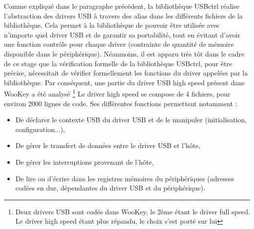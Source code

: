 \noindent Comme expliqué dans le paragraphe précédent, la bibliothèque USBctrl réalise l'abstraction des drivers USB à travers des alias dans les différents fichiers de la bibliothèque. Cela permet à la bibliothèque de pouvoir être utilisée avec n'importe quel driver USB et de garantir sa portabilité, tout en évitant d'avoir une fonction contrôle pour chaque driver (contrainte de quantité de mémoire disponible dans le périphérique). Néanmoins, il est apparu très tôt dans le cadre de ce stage que la vérification formelle de la bibliothèque USBctrl, pour être précise, nécessitait de vérifier formellement les fonctions du driver appelées par la bibliothèque. Par conséquent, une partie du driver USB high speed présent dans WooKey a été analysé \footnote{ Deux drivers USB sont codés dans WooKey, le 2ème étant le driver full speed. Le driver high speed étant plus répandu, le choix s'est porté sur lui}
\newline
\noindent Le driver high speed se compose de 4 fichiers, pour environ 2000 lignes de code. Ses différentes fonctions permettent notamment :
\begin{itemize}
	\item De déclarer le contexte USB du driver USB et de le manipuler (initialisation, configuration...),
	\item De gérer le transfert de données entre le driver USB et l'hôte,
	\item De gérer les interruptions provenant de l'hôte,
	\item De lire ou d'écrire dans les registres mémoires du périphériques (adresses codées en dur, dépendantes du driver USB et du périphérique).
\end{itemize}

